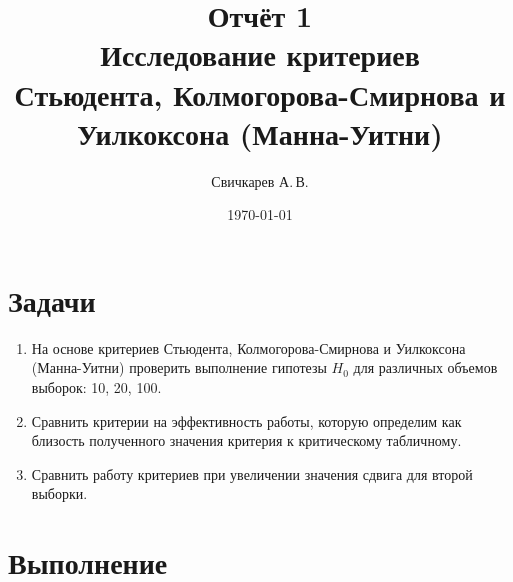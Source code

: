 \documentclass{article} %
\title{Отчёт 1\protect\\
Исследование критериев\\
Стьюдента, Колмогорова-Смирнова
и Уилкоксона (Манна-Уитни)} %
\author{Свичкарев А.\,В.} %
\date{\today} %
\begin{document}

\maketitle %

\section*{Задачи}
\begin{enumerate}
    \item На основе критериев Стьюдента,
        Колмогорова-Смирнова и Уилкоксона (Манна-Уитни)
        проверить выполнение гипотезы $H_0$
        для различных объемов выборок: 10, 20, 100. 
    \item Сравнить критерии на эффективность работы,
        которую определим как близость полученного значения критерия
        к критическому табличному.
    \item Сравнить работу критериев при увеличении значения сдвига
        для второй выборки.
\end{enumerate}

\section*{Выполнение}
\end{document}
